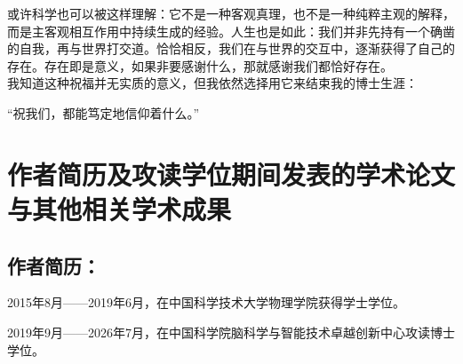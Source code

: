 或许科学也可以被这样理解：它不是一种客观真理，也不是一种纯粹主观的解释，而是主客观相互作用中持续生成的经验。人生也是如此：我们并非先持有一个确凿的自我，再与世界打交道。恰恰相反，我们在与世界的交互中，逐渐获得了自己的存在。存在即是意义，如果非要感谢什么，那就感谢我们都恰好存在。\\

我知道这种祝福并无实质的意义，但我依然选择用它来结束我的博士生涯：

“祝我们，都能笃定地信仰着什么。”

\chapter{作者简历及攻读学位期间发表的学术论文与其他相关学术成果}

\section*{作者简历：}
2015年8月——2019年6月，在中国科学技术大学物理学院获得学士学位。

2019年9月——2026年7月，在中国科学院脑科学与智能技术卓越创新中心攻读博士学位。


\cleardoublepage[plain]%
